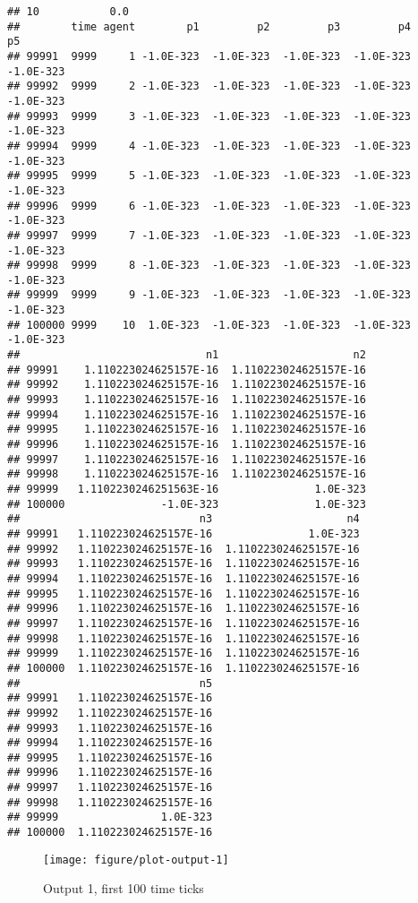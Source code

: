 \documentclass{article}\usepackage[]{graphicx}\usepackage[]{color}
\makeatletter
\def\maxwidth{ %
  \ifdim\Gin@nat@width>\linewidth
    \linewidth
  \else
    \Gin@nat@width
  \fi
}
\newenvironment{kframe}{%
 \def\at@end@of@kframe{}%
 \ifinner\ifhmode%
  \def\at@end@of@kframe{\end{minipage}}%
  \begin{minipage}{\columnwidth}%
 \fi\fi%
 \def\FrameCommand##1{\hskip\@totalleftmargin \hskip-\fboxsep
 \colorbox{shadecolor}{##1}\hskip-\fboxsep
     \hskip-\linewidth \hskip-\@totalleftmargin \hskip\columnwidth}%
 \MakeFramed {\advance\hsize-\width
   \@totalleftmargin\z@ \linewidth\hsize
   \@setminipage}}%
 {\par\unskip\endMakeFramed%
 \at@end@of@kframe}
\newenvironment{knitrout}{}{} %
\makeatother
\begin{document}
\begin{knitrout}
\begin{kframe}
\begin{verbatim}
## 10           0.0
##        time agent        p1         p2         p3         p4         p5
## 99991  9999     1 -1.0E-323  -1.0E-323  -1.0E-323  -1.0E-323  -1.0E-323
## 99992  9999     2 -1.0E-323  -1.0E-323  -1.0E-323  -1.0E-323  -1.0E-323
## 99993  9999     3 -1.0E-323  -1.0E-323  -1.0E-323  -1.0E-323  -1.0E-323
## 99994  9999     4 -1.0E-323  -1.0E-323  -1.0E-323  -1.0E-323  -1.0E-323
## 99995  9999     5 -1.0E-323  -1.0E-323  -1.0E-323  -1.0E-323  -1.0E-323
## 99996  9999     6 -1.0E-323  -1.0E-323  -1.0E-323  -1.0E-323  -1.0E-323
## 99997  9999     7 -1.0E-323  -1.0E-323  -1.0E-323  -1.0E-323  -1.0E-323
## 99998  9999     8 -1.0E-323  -1.0E-323  -1.0E-323  -1.0E-323  -1.0E-323
## 99999  9999     9 -1.0E-323  -1.0E-323  -1.0E-323  -1.0E-323  -1.0E-323
## 100000 9999    10  1.0E-323  -1.0E-323  -1.0E-323  -1.0E-323  -1.0E-323
##                             n1                     n2
## 99991    1.110223024625157E-16  1.110223024625157E-16
## 99992    1.110223024625157E-16  1.110223024625157E-16
## 99993    1.110223024625157E-16  1.110223024625157E-16
## 99994    1.110223024625157E-16  1.110223024625157E-16
## 99995    1.110223024625157E-16  1.110223024625157E-16
## 99996    1.110223024625157E-16  1.110223024625157E-16
## 99997    1.110223024625157E-16  1.110223024625157E-16
## 99998    1.110223024625157E-16  1.110223024625157E-16
## 99999   1.1102230246251563E-16               1.0E-323
## 100000               -1.0E-323               1.0E-323
##                            n3                     n4
## 99991   1.110223024625157E-16               1.0E-323
## 99992   1.110223024625157E-16  1.110223024625157E-16
## 99993   1.110223024625157E-16  1.110223024625157E-16
## 99994   1.110223024625157E-16  1.110223024625157E-16
## 99995   1.110223024625157E-16  1.110223024625157E-16
## 99996   1.110223024625157E-16  1.110223024625157E-16
## 99997   1.110223024625157E-16  1.110223024625157E-16
## 99998   1.110223024625157E-16  1.110223024625157E-16
## 99999   1.110223024625157E-16  1.110223024625157E-16
## 100000  1.110223024625157E-16  1.110223024625157E-16
##                            n5
## 99991   1.110223024625157E-16
## 99992   1.110223024625157E-16
## 99993   1.110223024625157E-16
## 99994   1.110223024625157E-16
## 99995   1.110223024625157E-16
## 99996   1.110223024625157E-16
## 99997   1.110223024625157E-16
## 99998   1.110223024625157E-16
## 99999                1.0E-323
## 100000  1.110223024625157E-16
\end{verbatim}
\end{kframe}\begin{figure}[]

\texttt{[image: figure/plot-output-1]} \caption[Output 1, first 100 time ticks]{Output 1, first 100 time ticks\label{fig:plot-output-1}}
\end{figure}


\end{knitrout}
\end{document}
